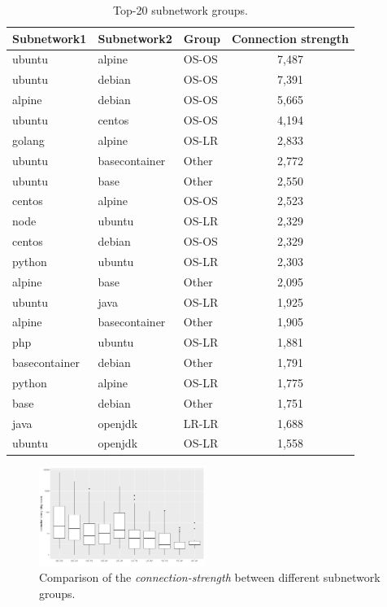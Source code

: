 \documentclass[sigconf]{acmart}
\begin{document}
\begin{table}[htbp]
  \centering
  \small
  \caption{Top-20 subnetwork groups.}\vspace{-0.3cm}
    \begin{tabular}{lllc}
	\toprule
    Subnetwork1 & Subnetwork2 & Group & \multicolumn{1}{l}{Connection strength} \\
	\midrule
    ubuntu & alpine & OS-OS & 7,487 \\
    ubuntu & debian & OS-OS & 7,391 \\
    alpine & debian & OS-OS & 5,665 \\
    ubuntu & centos & OS-OS & 4,194 \\
    golang & alpine & OS-LR & 2,833 \\
    ubuntu & basecontainer & Other & 2,772 \\
    ubuntu & base  & Other & 2,550 \\
    centos & alpine & OS-OS & 2,523 \\
    node  & ubuntu & OS-LR & 2,329 \\
    centos & debian & OS-OS & 2,329 \\
    python & ubuntu & OS-LR & 2,303 \\
    alpine & base  & Other & 2,095 \\
    ubuntu & java  & OS-LR & 1,925 \\
    alpine & basecontainer & Other & 1,905 \\
    php   & ubuntu & OS-LR & 1,881 \\
    basecontainer & debian & Other & 1,791 \\
    python & alpine & OS-LR & 1,775 \\
    base  & debian & Other & 1,751 \\
    java  & openjdk & LR-LR & 1,688 \\
    ubuntu & openjdk & OS-LR & 1,558 \\
	\bottomrule
    \end{tabular}%
  \label{tab:rel}%
\end{table}%



\begin{figure}[htbp]
\centerline{\includegraphics[width=0.48\textwidth]{picture//typepairs_linkstrength.pdf}}\vspace{-0.3cm}
\caption{Comparison of the \emph{connection-strength} between different subnetwork groups.}
\label{fig:connection distribution}
\end{figure}
\end{document}
